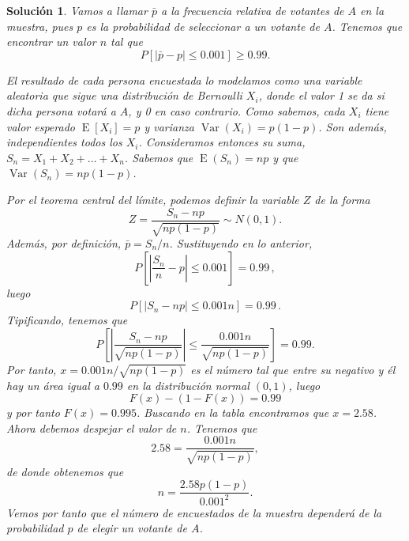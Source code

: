 \documentclass[
  a4paper,
  spanish,
  12pt,
]{scrartcl}
\theoremstyle{ejercicio-style}
\theoremstyle{remark-style}
\newtheorem*{sol}{Solución}
\begin{document}
\begin{sol}

  Vamos a llamar \(\bar{p}\) a la frecuencia relativa de votantes de \(A\) en la muestra, pues \(p\) es la probabilidad de seleccionar a un votante de \(A\).
  Tenemos que encontrar un valor \(n\) tal que
  \[
    P[|\bar{p}-p| \leq 0.001] \geq 0.99.
  \]

  El resultado de cada persona encuestada lo modelamos como una variable aleatoria que sigue una distribución de Bernoulli \(X_i\), donde el valor 1 se da si dicha persona votará a \(A\), y 0 en caso contrario.
  Como sabemos, cada \(X_i\) tiene valor esperado \(\operatorname{E}[X_i] = p\) y varianza \(\operatorname{Var}(X_i) = p(1-p)\).
  Son además, independientes todos los \(X_i\).
  Consideramos entonces su suma, \(S_n = X_1 + X_2 + \dots + X_n\).
  Sabemos que \(\operatorname{E}(S_n) = np\) y que \(\operatorname{Var}(S_n) = np(1-p)\).

  Por el teorema central del límite, podemos definir la variable \(Z\) de la forma
  \[
    Z = \frac{S_n - np}{\sqrt{np(1-p)}} \sim N(0,1).
  \]
  Además, por definición, \(\bar{p} = S_n/n\). Sustituyendo en lo anterior,
  \[
    P\left[\left|\frac{S_n}{n} - p\right| \leq 0.001\right] = 0.99\,,
  \]
  luego
  \[
    P\left[\left|S_n - np\right| \leq 0.001n\right] = 0.99\,.
  \]
  Tipificando, tenemos que
  \[
    P\left[
      \left|\frac{S_n - np}{\sqrt{np(1-p)}}\right| \leq \frac{0.001n}{\sqrt{np(1-p)}}
    \right] = 0.99.
  \]
  Por tanto, \(x = 0.001n/\sqrt{np(1-p)}\) es el número tal que entre su negativo y él hay un área igual a \(0.99\) en la distribución normal \((0,1)\), luego
  \[
    F(x) - (1-F(x)) = 0.99
  \]
  y por tanto \(F(x) = 0.995\). Buscando en la tabla encontramos que \(x = 2.58\). Ahora debemos despejar el valor de \(n\). Tenemos que
  \[
    2.58 = \frac{0.001n}{\sqrt{np(1-p)}},
  \]
  de donde obtenemos que
  \[
    n = \frac{2.58p(1-p)}{0.001^2}.
  \]
  Vemos por tanto que el número de encuestados de la muestra dependerá de la probabilidad \(p\) de elegir un votante de \(A\).
\end{sol}
\end{document}
